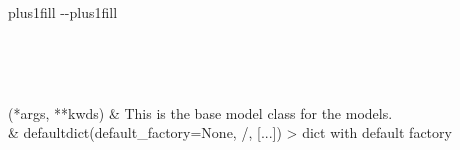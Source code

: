 \documentclass[letterpaper,10pt,english]{sphinxmanual}
\begin{document}
\begin{savenotes}
\sphinxatlongtablestart
\sphinxthistablewithglobalstyle
\sphinxthistablewithnovlinesstyle
\makeatletter
  \LTleft \@totalleftmargin plus1fill
  \LTright\dimexpr\columnwidth-\@totalleftmargin-\linewidth\relax plus1fill
\makeatother
\begin{longtable}{}
\sphinxtoprule
\endfirsthead

\\
\sphinxtoprule
\endhead

\sphinxbottomrule
{}\\
\endfoot

\endlastfoot
\sphinxtableatstartofbodyhook

\sphinxAtStartPar
{\hyperref[\detokenize{src.common.model:src.common.model.Model}]{}}(*args, **kwds)
&
\sphinxAtStartPar
This is the base model class for the models.
\\
\sphinxhline
\sphinxAtStartPar
{}
&
\sphinxAtStartPar
defaultdict(default\_factory=None, /, {[}...{]}) \sphinxhyphen{}\sphinxhyphen{}\textgreater{} dict with default factory
\\
\sphinxbottomrule
\end{longtable}
\sphinxtableafterendhook
\sphinxatlongtableend
\end{savenotes}
\end{document}
